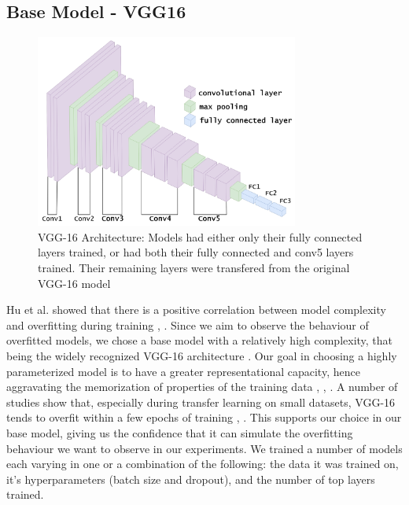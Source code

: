 \documentclass[conference]{IEEEtran}
\begin{document}
\subsection{Base Model - VGG16}
\begin{figure} [h]
    \centering
    \includegraphics[height=2.5in]{imgs/VGG16architecture.png}
    \caption{VGG-16 Architecture: Models had either only their fully connected layers trained, or had both their fully connected and conv5 layers trained. Their remaining layers were transfered from the original VGG-16 model \cite{vgg16}}
    \label{fig:vgg16}
\end{figure}
Hu et al. showed that there is a positive correlation between model complexity and overfitting during training \cite{complexity}, \cite{modelcomplexity}. Since we aim to observe the behaviour of overfitted models, we chose a base model with a relatively high complexity, that being the widely recognized VGG-16 architecture \cite{vgg16}. Our goal in choosing a highly parameterized model is to have a greater representational capacity, hence aggravating the memorization of properties of the training data \cite{overandunder}, \cite{labelrecorder}, \cite{interpvscomp}. A number of studies show that, especially during transfer learning on small datasets, VGG-16 tends to overfit within a few epochs of training \cite{vgg16overfit}, \cite{vgg16overfit2}. This supports our choice in our base model, giving us the confidence that it can simulate the overfitting behaviour we want to observe in our experiments. We trained a number of models each varying in one or a combination of the following: the data it was trained on, it's hyperparameters (batch size and dropout), and the number of top layers trained. 
\end{document}
